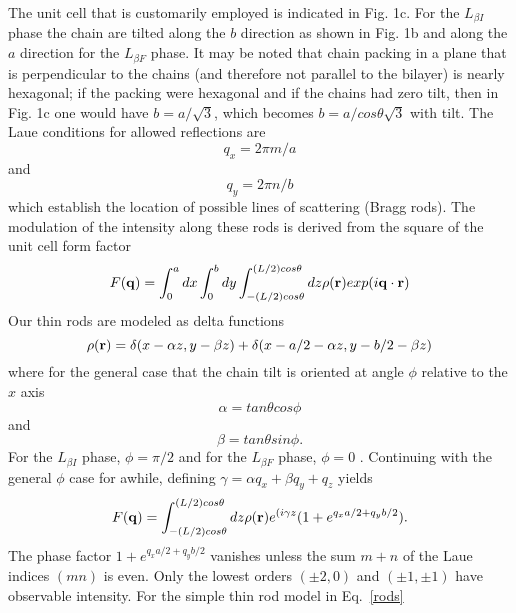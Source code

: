 \documentclass[
 preprint,
 showkeys, 
 amsmath,
 amssymb,
 aps,
]{revtex4-1}
\begin{document}
The unit cell that is customarily employed is indicated in Fig. 1c.  For the $L_{{\beta}I}$ phase the chain are tilted along the $b$ direction as shown in Fig. 1b and along the $a$ direction for the $L_{{\beta}F}$ phase.  It may be noted that chain packing in a plane that is perpendicular to the chains (and therefore not parallel to the bilayer) is nearly hexagonal; if the packing were hexagonal and if the chains had zero tilt, then in Fig. 1c one would have $b=a/\sqrt{3}$, which becomes $b=a/cos{\theta}\sqrt{3}$ with tilt.  The Laue conditions for allowed reflections are 
\begin{equation}\label{Laue1}
q_x=2{\pi}m/a 
\end{equation}
and
\begin{equation}\label{Laue2}
q_y=2{\pi}n/b 
\end{equation}
which establish the location of possible lines of scattering (Bragg rods). The modulation of the intensity along these rods is derived from the square of the unit cell form factor
\begin{equation}\label{S(q)}
F(\mathbf{q}) = \int_{0}^{a}dx\int_{0}^{b}dy\int_{-(L/2)cos{\theta}}^{(L/2)cos{\theta}}dz\rho(\bold{r})exp(i\bold{q}\cdot\bold{r})
\end{equation}
Our thin rods are modeled as delta functions
\begin{equation}\label{rods}
\rho(\bold{r})=\delta(x-{\alpha}z,y-{\beta}z)+\delta(x-a/2-{\alpha}z,y-b/2-{\beta}z)
\end{equation}
where for the general case that the chain tilt is oriented at angle $\phi$ relative to the $x$ axis 
\begin{equation}\label{alpha}
\alpha=tan{\theta}cos{\phi}
\end{equation}
and
\begin{equation}\label{beta}
\beta=tan{\theta}sin{\phi}.
\end{equation}
For the $L_{{\beta}I}$ phase, $\phi={\pi}/2$ and for the $L_{{\beta}F}$ phase, $\phi=0$ .  Continuing with the general $\phi$ case for awhile,
defining $\gamma = {\alpha}q_x+{\beta}q_y+q_z$ yields
\begin{equation}\label{S(q)}
F(\bold{q}) = \int_{-(L/2)cos{\theta}}^{(L/2)cos{\theta}}dz\rho(\bold{r})e^{(i{\gamma}z}(1+e^{q_xa/2+q_yb/2}).
\end{equation}
The phase factor $1+e^{q_xa/2+q_yb/2}$ vanishes unless the sum $m+n$ of the Laue indices $(mn)$ is even. Only the lowest orders $(\pm2,0)$ and $(\pm1,\pm1)$ have observable intensity.  For the simple thin rod model in Eq.~\ref{rods} 
\end{document}
